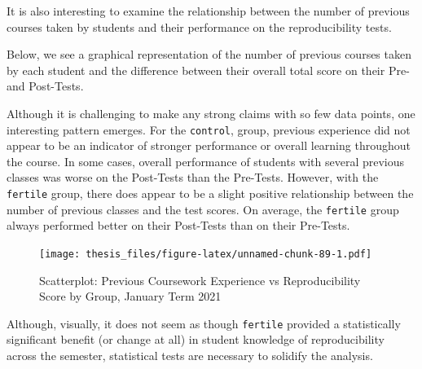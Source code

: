 \documentclass[12pt,twoside]{reedthesis}
\begin{document}
It is also interesting to examine the relationship between the number of previous courses taken by students and their performance on the reproducibility tests.

Below, we see a graphical representation of the number of previous courses taken by each student and the difference between their overall total score on their Pre- and Post-Tests.

Although it is challenging to make any strong claims with so few data points, one interesting pattern emerges. For the \texttt{control}, group, previous experience did not appear to be an indicator of stronger performance or overall learning throughout the course. In some cases, overall performance of students with several previous classes was worse on the Post-Tests than the Pre-Tests. However, with the \texttt{fertile} group, there does appear to be a slight positive relationship between the number of previous classes and the test scores. On average, the \texttt{fertile} group always performed better on their Post-Tests than on their Pre-Tests.
\begin{figure}
\centering
\texttt{[image: thesis\_files/figure-latex/unnamed-chunk-89-1.pdf]}
\caption{\label{fig:unnamed-chunk-89}Scatterplot: Previous Coursework Experience vs Reproducibility Score by Group, January Term 2021}
\end{figure}
Although, visually, it does not seem as though \texttt{fertile} provided a statistically significant benefit (or change at all) in student knowledge of reproducibility across the semester, statistical tests are necessary to solidify the analysis.
\end{document}
